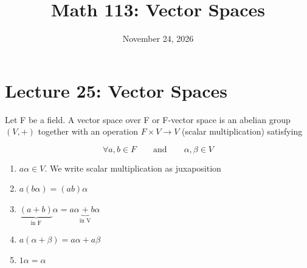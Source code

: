 \documentclass[main.tex]{subfiles}
\title{Math 113: Vector Spaces}
\author{\defaultauthor}
\date{November 24, 2026}
\begin{document}
\ifSubfilesClassLoaded{\maketitle}{}

\section{Lecture 25: Vector Spaces}
\begin{definition}
    Let F be a field. A vector space over F or F-vector space is an abelian group $(V, +)$ together with an operation $F \times V \to V$ (scalar multiplication) satisfying

    $$\forall a, b \in F \qquad \text{and} \qquad \alpha, \beta \in V$$
    \begin{enumerate}
        \item $a \alpha \in V$. We write scalar multiplication as juxaposition
        \item $a(b \alpha) = (ab) \alpha$
        \item $\underbrace{(a+b)}_{\text{in F}} \alpha = a \alpha \underbrace{+}_{\text{in V}} b \alpha$
        \item $a(\alpha + \beta) = a \alpha + a \beta$
        \item $1 \alpha = \alpha$
    \end{enumerate}
\end{definition}
\end{document}
